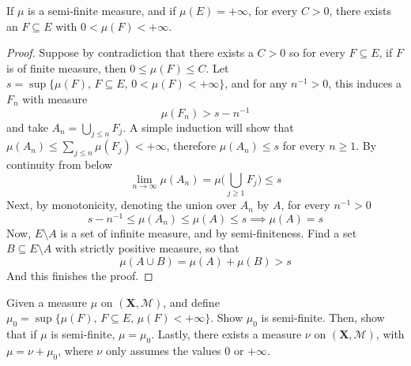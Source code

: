\documentclass[../../main.tex]{subfiles}
\begin{document}
\newpage{}
\begin{wts}
If $\mu$ is a semi-finite measure, and if $\mu(E)=+\infty$, for every $C>0$, there exists an $F\subseteq E$ with $0<\mu(F)<+\infty$.
\end{wts}
\begin{proof}
    Suppose by contradiction that there exists a $C>0$ so for every $F\subseteq E$, if $F$ is of finite measure, then $0\leq \mu(F)\leq C$. Let $s = \sup\{\mu(F),\,F\subseteq E,\, 0<\mu(F)<+\infty\}$, and for any $n^{-1}>0$, this induces a $F_n$ with measure\[\mu(F_n)>s-n^{-1}\] and take $A_n = \bigcup_{j\leq n}F_j$. A simple induction will show that $\mu(A_n)\leq \sum_{j\leq n} \mu(F_j)<+\infty$, therefore $\mu(A_n)\leq s$ for every $n\geq 1$. By continuity from below\[\lim_{n\to\infty}\mu(A_n)=\mu\biggl(\bigcup_{j\geq 1}F_j\biggr)\leq s\]
    Next, by monotonicity, denoting the union over $A_n$ by $A$, for every $n^{-1}>0$\[s-n^{-1}\leq\mu(A_n)\leq\mu(A)\leq s\implies \mu(A)=s\]
    Now, $E\setminus A$ is a set of infinite measure, and by semi-finiteness. Find a set $B\subseteq E\setminus A$ with strictly positive measure, so that \[\mu(A\cup B)=\mu(A)+\mu(B)>s\]
And this finishes the proof.
\end{proof}
\newpage
{}
\providecommand{\xx}{\mathbf{X}}
\providecommand{\calm}{\mathcal{M}}
\begin{wts}
    Given a measure $\mu$ on $(\xx,\calm)$, and define $\mu_0 = \sup\{\mu(F),\, F\subseteq E,\, \mu(F)<+\infty\}$. Show $\mu_0$ is semi-finite. Then, show that if $\mu$ is semi-finite, $\mu=\mu_0$. Lastly, there exists a measure $\nu$ on $(\xx,\calm)$, with $\mu = \nu + \mu_0$, where $\nu$ only assumes the values $0$ or $+\infty$.
\end{wts}
\end{document}

